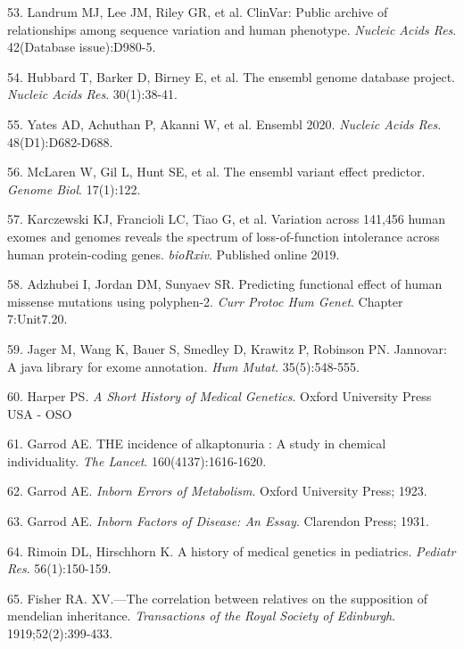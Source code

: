 \documentclass[11pt,letterpaper]{book}
\begin{document}
\leavevmode\hypertarget{ref-landrum:2014aa}{}%
53. Landrum MJ, Lee JM, Riley GR, et al. ClinVar: Public archive of relationships among sequence variation and human phenotype. \emph{Nucleic Acids Res}. 42(Database issue):D980-5.

\leavevmode\hypertarget{ref-hubbard:2002aa}{}%
54. Hubbard T, Barker D, Birney E, et al. The ensembl genome database project. \emph{Nucleic Acids Res}. 30(1):38-41.

\leavevmode\hypertarget{ref-yates:2020aa}{}%
55. Yates AD, Achuthan P, Akanni W, et al. Ensembl 2020. \emph{Nucleic Acids Res}. 48(D1):D682-D688.

\leavevmode\hypertarget{ref-mclaren:2016aa}{}%
56. McLaren W, Gil L, Hunt SE, et al. The ensembl variant effect predictor. \emph{Genome Biol}. 17(1):122.

\leavevmode\hypertarget{ref-karczewski:2019aa}{}%
57. Karczewski KJ, Francioli LC, Tiao G, et al. Variation across 141,456 human exomes and genomes reveals the spectrum of loss-of-function intolerance across human protein-coding genes. \emph{bioRxiv}. Published online 2019.

\leavevmode\hypertarget{ref-adzhubei:2013aa}{}%
58. Adzhubei I, Jordan DM, Sunyaev SR. Predicting functional effect of human missense mutations using polyphen-2. \emph{Curr Protoc Hum Genet}. Chapter 7:Unit7.20.

\leavevmode\hypertarget{ref-jager:2014aa}{}%
59. Jager M, Wang K, Bauer S, Smedley D, Krawitz P, Robinson PN. Jannovar: A java library for exome annotation. \emph{Hum Mutat}. 35(5):548-555.

\leavevmode\hypertarget{ref-harper:2008aa}{}%
60. Harper PS. \emph{A Short History of Medical Genetics}. Oxford University Press USA - OSO

\leavevmode\hypertarget{ref-garrod:1902aa}{}%
61. Garrod AE. THE incidence of alkaptonuria : A study in chemical individuality. \emph{The Lancet}. 160(4137):1616-1620.

\leavevmode\hypertarget{ref-garrod:1923aa}{}%
62. Garrod AE. \emph{Inborn Errors of Metabolism}. Oxford University Press; 1923.

\leavevmode\hypertarget{ref-garrod:1931aa}{}%
63. Garrod AE. \emph{Inborn Factors of Disease: An Essay}. Clarendon Press; 1931.

\leavevmode\hypertarget{ref-rimoin:2004aa}{}%
64. Rimoin DL, Hirschhorn K. A history of medical genetics in pediatrics. \emph{Pediatr Res}. 56(1):150-159.

\leavevmode\hypertarget{ref-fisher:1919aa}{}%
65. Fisher RA. XV.---The correlation between relatives on the supposition of mendelian inheritance. \emph{Transactions of the Royal Society of Edinburgh}. 1919;52(2):399-433.
\end{document}
